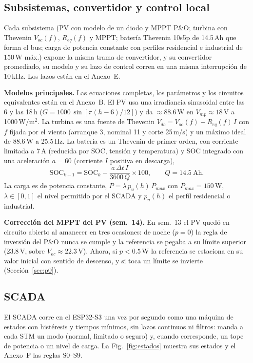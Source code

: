 \documentclass[conference]{IEEEtran}
\begin{document}
\subsection{Subsistemas, convertidor y control local}

Cada subsistema (PV con modelo de un diodo y MPPT P\&O; turbina con Thevenin $V_{oc}(f)$, $R_{eq}(f)$ y MPPT; batería Thevenin 10s5p de 14.5\,Ah que forma el bus; carga de potencia constante con perfiles residencial e industrial de 150\,W máx.) expone la misma trama de convertidor, y su convertidor promediado, su modelo y su lazo de control corren en una misma interrupción de 10\,kHz. Los lazos están en el Anexo~E.

\textbf{Modelos principales.} Las ecuaciones completas, los parámetros y los circuitos equivalentes están en el Anexo~B. El PV usa una irradiancia sinusoidal entre las 6 y las 18\,h ($G=1000\,\sin[\pi(h-6)/12]$) y da $\approx$88.6\,W en $V_{mp}\approx18$\,V a 1000\,W/m$^2$. La turbina es una fuente de Thevenin $V_{dc}=V_{oc}(f)-R_{eq}(f)\,I$ con $f$ fijada por el viento (arranque 3, nominal 11 y corte 25\,m/s) y un máximo ideal de 88.6\,W a 25.5\,Hz. La batería es un Thevenin de primer orden, con corriente limitada a 7\,A (reducida por SOC, tensión y temperatura) y SOC integrado con una aceleración $a=60$ (corriente $I$ positiva en descarga),
\begin{equation}
\label{eq:SOC}
\mathrm{SOC}_{k+1}=\mathrm{SOC}_k-\frac{a\,\Delta t\,I}{3600\,Q}\times100,\qquad Q=14.5\ \mathrm{Ah}.
\end{equation}
La carga es de potencia constante, $P=\lambda\,p_u(h)\,P_{max}$ con $P_{max}=150$\,W, $\lambda\in[0,1]$ el nivel permitido por el SCADA y $p_u(h)$ el perfil residencial o industrial.

\textbf{Corrección del MPPT del PV (sem.~14).} En sem.~13 el PV quedó en circuito abierto al amanecer en tres ocasiones: de noche ($p=0$) la regla de inversión del P\&O nunca se cumple y la referencia se pegaba a su límite superior (23.8\,V, sobre $V_{oc}\approx22.3$\,V). Ahora, si $p<0.5$\,W la referencia se estaciona en su valor inicial con sentido de descenso, y si toca un límite se invierte (Sección~\ref{sec:p0}).


\subsection{SCADA}

El SCADA corre en el ESP32-S3 una vez por segundo como una máquina de estados con histéresis y tiempos mínimos, sin lazos continuos ni filtros: manda a cada STM un modo (normal, limitado o seguro) y, cuando corresponde, un tope de potencia o un nivel de carga. La Fig.~\ref{fig:estados} muestra sus estados y el Anexo~F las reglas S0--S9.
\end{document}
